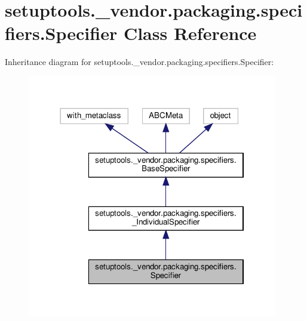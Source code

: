 \hypertarget{classsetuptools_1_1__vendor_1_1packaging_1_1specifiers_1_1Specifier}{}\section{setuptools.\+\_\+vendor.\+packaging.\+specifiers.\+Specifier Class Reference}
\label{classsetuptools_1_1__vendor_1_1packaging_1_1specifiers_1_1Specifier}


Inheritance diagram for setuptools.\+\_\+vendor.\+packaging.\+specifiers.\+Specifier\+:
\nopagebreak
\begin{figure}[H]
\begin{center}
\leavevmode
\includegraphics[width=310pt]{classsetuptools_1_1__vendor_1_1packaging_1_1specifiers_1_1Specifier__inherit__graph}
\end{center}
\end{figure}


